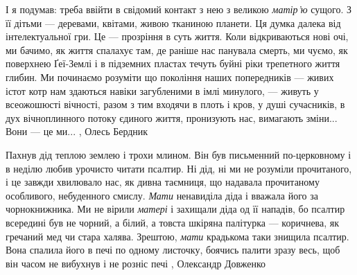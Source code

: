І я подумав: треба ввійти в свідомий контакт з нею з великою \emph{матір’ю} сущого. З
її дітьми — деревами, квітами, живою тканиною планети. Ця думка далека від
інтелектуальної гри. Це — прозріння в суть життя. Коли відкриваються нові очі,
ми бачимо, як життя спалахує там, де раніше нас панувала смерть, ми чуємо, як
поверхнею Ґеї-Землі і в підземних пластах течуть буйні ріки трепетного життя
глибин. Ми починаємо розуміти що покоління наших попередників — живих істот
котр нам здаються навіки загубленими в імлі минулого, — живуть у всеожошюсті
вічності, разом з тим входячи в плоть і кров, у душі сучасників, в дух
вічноплинного потоку єдиного життя, пронизують нас, вимагають зміни... Вони — це
ми...
, Олесь Бердник

Пахнув дід теплою землею і трохи млином. Він був письменний по-церковному і в
неділю любив урочисто читати псалтир. Ні дід, ні ми не розуміли прочитаного, і
це завжди хвилювало нас, як дивна таємниця, що надавала прочитаному особливого,
небуденного смислу.  \emph{Мати} ненавиділа діда і вважала його за
чорнокнижника. Ми не вірили \emph{матері} і захищали діда од її нападів, бо
псалтир всередині був не чорний, а білий, а товста шкіряна палітурка —
коричнева, як гречаний мед чи стара халява. Зрештою, \emph{мати} крадькома таки
знищила псалтир. Вона спалила його в печі по одному листочку, боячись палити
зразу весь, щоб він часом не вибухнув і не розніс печі
, Олександр Довженко
